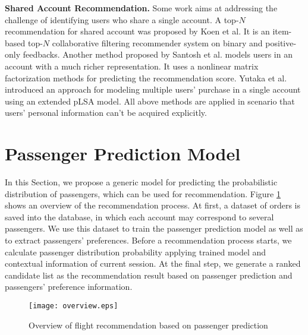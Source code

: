 \documentclass{llncs}
\begin{document}
\textbf{Shared Account Recommendation.} Some work aims at addressing the challenge of identifying users who share a single account. A top-$N$ recommendation for shared account  was proposed by Koen et al\cite{koen:top-n}. It is an item-based top-$N$ collaborative filtering recommender system on binary and positive-only feedbacks. Another method proposed by Santosh et al.\cite{kabbur:nlmf} models users in an account with a much richer representation. It uses a nonlinear matrix factorization methods for predicting the recommendation score. Yutaka et al.\cite{yutaka:modeling} introduced an approach for modeling multiple users' purchase in a single account using an extended pLSA model. All above methods are applied in scenario that users' personal information can't be acquired explicitly.

\section{Passenger Prediction Model}
\label{sec:mod}
In this Section, we propose a generic model for predicting the probabilistic distribution of passengers, which can be used for recommendation.  Figure \ref{fig:over} shows an overview of the recommendation process. At first, a dataset of orders is saved into the database, in which each account may correspond to several passengers. We use this dataset to train the passenger prediction model as well as to extract passengers' preferences. Before a recommendation process starts, we calculate passenger distribution probability applying trained model and contextual information of current session. At the final step, we generate a ranked candidate list as the recommendation result based on passenger prediction and passengers' preference information.\par
\begin{figure}[!hbt]
\centering
\texttt{[image: overview.eps]}
\caption{Overview of flight recommendation based on passenger prediction}
\label{fig:over}
\end{figure}\par
\end{document}
